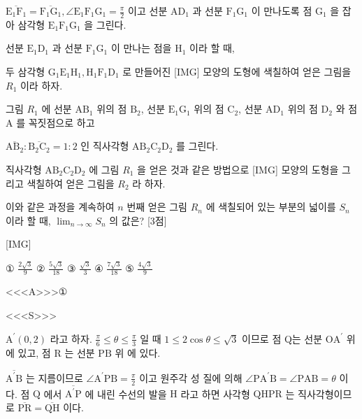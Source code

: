 \documentclass{oblivoir}
\begin{document}
$\overline{\mathrm{E}_{1} \mathrm{F}_{1}}=\overline{\mathrm{F}_{1} \mathrm{G}_{1}}, \angle \mathrm{E}_{1} \mathrm{F}_{1} \mathrm{G}_{1}=\frac{\pi}{2}$ 이고
선분 $\mathrm{AD}_{1}$ 과 선분 $\mathrm{F}_{1} \mathrm{G}_{1}$ 이 만나도록 점 $\mathrm{G}_{1}$ 을 잡아 삼각형 $\mathrm{E}_{1} \mathrm{F}_{1} \mathrm{G}_{1}$ 을 그린다.

선분 $\mathrm{E}_{1} \mathrm{D}_{1}$ 과 선분 $\mathrm{F}_{1} \mathrm{G}_{1}$ 이 만나는 점을 $\mathrm{H}_{1}$ 이라 할 때,

두 삼각형 $\mathrm{G}_{1} \mathrm{E}_{1} \mathrm{H}_{1}, \mathrm{H}_{1} \mathrm{F}_{1} \mathrm{D}_{1}$ 로 만들어진 [IMG] 모양의 도형에 색칠하여 얻은 그림을 $R_{1}$ 이라 하자.

그림 $R_{1}$ 에 선분 $\mathrm{AB}_{1}$ 위의 점 $\mathrm{B}_{2}$, 선분 $\mathrm{E}_{1} \mathrm{G}_{1}$ 위의 점 $\mathrm{C}_{2}$, 선분 $\mathrm{AD}_{1}$ 위의 점 $\mathrm{D}_{2}$ 와 점 $\mathrm{A}$ 를 꼭짓점으로 하고 

$\overline{\mathrm{AB}_{2}}: \overline{\mathrm{B}_{2} \mathrm{C}_{2}}=1: 2$ 인 직사각형 $\mathrm{AB}_{2} \mathrm{C}_{2} \mathrm{D}_{2}$ 를 그린다.

직사각형 $\mathrm{AB}_{2} \mathrm{C}_{2} \mathrm{D}_{2}$ 에 그림 $R_{1}$ 을 얻은 것과 같은 방법으로 [IMG] 모양의 도형을 그리고 색칠하여 얻은 그림을 $R_{2}$ 라 하자.

이와 같은 과정을 계속하여 $n$ 번째 얻은 그림 $R_{n}$ 에 색칠되어 있는 부분의 넓이를 $S_{n}$ 이라 할 때, $\lim _{n \rightarrow \infty} S_{n}$ 의 값은? [3점]


[IMG]

① $\frac{2 \sqrt{3}}{9}$
② $\frac{5 \sqrt{3}}{18}$
③ $\frac{\sqrt{3}}{3}$
④ $\frac{7 \sqrt{3}}{18}$
⑤ $\frac{4 \sqrt{3}}{9}$


<<<A>>>①

<<<S>>>



$\mathrm{A}^{\prime}(0,2)$ 라고 하자. $\frac{\pi}{6} \leq \theta \leq \frac{\pi}{3}$ 일 때 $1 \leq 2 \cos \theta \leq \sqrt{3}$ 이므로 점 Q는 선분 $\mathrm{OA}^{\prime}$ 위에 있고, 점 $\mathrm{R}$ 는 선분 $\mathrm{PB}$ 위 에 있다.

$\overline{\mathrm{A}^{\prime} \mathrm{B}}$ 는 지름이므로 $\angle \mathrm{A}^{\prime} \mathrm{PB}=\frac{\pi}{2}$ 이고 원주각 성 질에 의해 $\angle \mathrm{PA}^{\prime} \mathrm{B}=\angle \mathrm{P} \mathrm{AB}=\theta$ 이다.
점 $\mathrm{Q}$ 에서 $\overline{\mathrm{A}^{\prime} \mathrm{P}}$ 에 내린 수선의 발을 $\mathrm{H}$ 라고 하면 사각형 $\mathrm{QHPR}$ 는 직사각형이므로 $\overline{\mathrm{PR}}=\overline{\mathrm{QH}}$ 이다.
\end{document}
